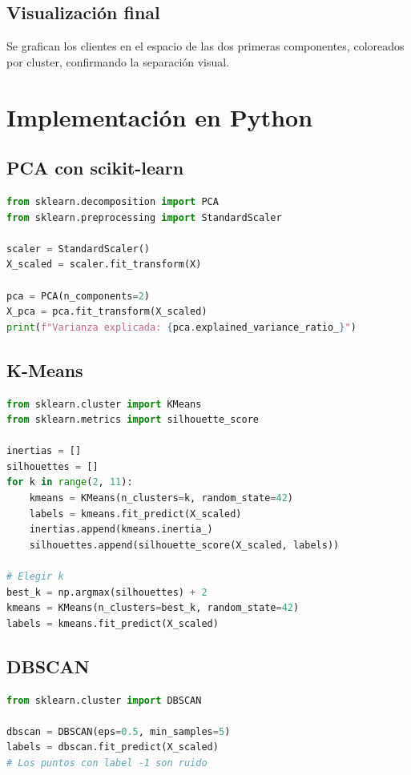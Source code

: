\documentclass[12pt,a4paper,openany,oneside]{book}
\begin{document}
\subsection{Visualización final}
Se grafican los clientes en el espacio de las dos primeras componentes, coloreados por cluster, confirmando la separación visual.

\section{Implementación en Python}

\subsection{PCA con scikit-learn}
\begin{lstlisting}[language=Python]
from sklearn.decomposition import PCA
from sklearn.preprocessing import StandardScaler

scaler = StandardScaler()
X_scaled = scaler.fit_transform(X)

pca = PCA(n_components=2)
X_pca = pca.fit_transform(X_scaled)
print(f"Varianza explicada: {pca.explained_variance_ratio_}")
\end{lstlisting}

\subsection{K-Means}
\begin{lstlisting}[language=Python]
from sklearn.cluster import KMeans
from sklearn.metrics import silhouette_score

inertias = []
silhouettes = []
for k in range(2, 11):
    kmeans = KMeans(n_clusters=k, random_state=42)
    labels = kmeans.fit_predict(X_scaled)
    inertias.append(kmeans.inertia_)
    silhouettes.append(silhouette_score(X_scaled, labels))

# Elegir k
best_k = np.argmax(silhouettes) + 2
kmeans = KMeans(n_clusters=best_k, random_state=42)
labels = kmeans.fit_predict(X_scaled)
\end{lstlisting}

\subsection{DBSCAN}
\begin{lstlisting}[language=Python]
from sklearn.cluster import DBSCAN

dbscan = DBSCAN(eps=0.5, min_samples=5)
labels = dbscan.fit_predict(X_scaled)
# Los puntos con label -1 son ruido
\end{lstlisting}
\end{document}
